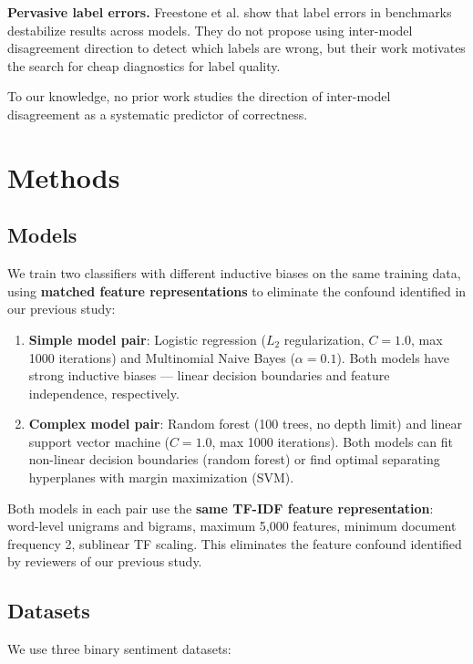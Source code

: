 \documentclass[11pt,letterpaper]{article}
\begin{document}
\noindent\textbf{Pervasive label errors.} Freestone et al. \citep{Freestone2019} show that label errors in benchmarks destabilize results across models. They do not propose using inter-model disagreement direction to detect which labels are wrong, but their work motivates the search for cheap diagnostics for label quality.

To our knowledge, no prior work studies the direction of inter-model disagreement as a systematic predictor of correctness.

\section{Methods}

\subsection{Models}

We train two classifiers with different inductive biases on the same training data, using \textbf{matched feature representations} to eliminate the confound identified in our previous study:

\begin{enumerate}
  \item \textbf{Simple model pair}: Logistic regression ($L_2$ regularization, $C=1.0$, max 1000 iterations) and Multinomial Naive Bayes ($\alpha=0.1$). Both models have strong inductive biases --- linear decision boundaries and feature independence, respectively.
  \item \textbf{Complex model pair}: Random forest (100 trees, no depth limit) and linear support vector machine ($C=1.0$, max 1000 iterations). Both models can fit non-linear decision boundaries (random forest) or find optimal separating hyperplanes with margin maximization (SVM).
\end{enumerate}

Both models in each pair use the \textbf{same TF-IDF feature representation}: word-level unigrams and bigrams, maximum 5,000 features, minimum document frequency 2, sublinear TF scaling. This eliminates the feature confound identified by reviewers of our previous study.

\subsection{Datasets}

We use three binary sentiment datasets:
\end{document}
